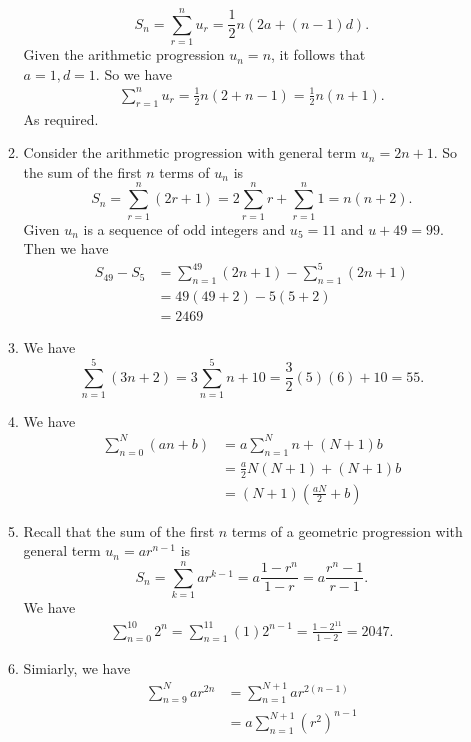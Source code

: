 \documentclass[12pt,oneside]{book}
\begin{document}
\begin{enumerate}
\begin{enumerate}
\[                S_n = \sum_{r=1}^{n} u_r = \frac{1}{2} n (2a + (n-1) d)
            .\] 
            Given the arithmetic progression $u_n = n$, it follows that \\ $a = 1, d = 1$. So we have \begin{align*}
                \sum_{r=1}^{n} u_r = \frac{1}{2} n (2 + n - 1) = \frac{1}{2} n (n + 1). 
            \end{align*}
            As required.
            \item Consider the arithmetic progression with general term $u_n = 2n + 1$. So the sum of the first $n$ terms of $u_n$ is \[
                S_n = \sum_{r=1}^{n} (2r + 1) = 2 \sum_{r=1}^{n} r + \sum_{r=1}^{n} 1 = n(n + 2)  
            .\]  Given $u_n$ is a sequence of odd integers and $u_5 = 11$ and $u+49 = 99$. Then we have \begin{align*}
                S_{49} - S_{5} &= \sum_{n=1}^{49} (2n + 1) - \sum_{n=1}^{5} (2n+1) \\ 
                &= 49(49 + 2) - 5(5 + 2) \\
                &= 2469
            \end{align*}
            \item We have \[
                \sum_{n=1}^{5} (3n + 2) = 3 \sum_{n=1}^{5} n + 10 = \frac{3}{2} (5)(6) + 10 = 55
            .\] 
            \item We have \begin{align*}
                \sum_{n=0}^{N} (an+b) &= a \sum_{n=1}^{N} n + (N+1)b \\
                &= \frac{a}{2} N (N + 1) + (N+1)b \\
                &= (N+1) \left( \frac{aN}{2} + b \right) 
            \end{align*}
            \item  Recall that the sum of the first $n$ terms of a geometric progression with general term $u_n = ar^{n -1}$ is \[
                S_n = \sum_{k=1}^{n} ar^{k-1} = a\frac{1-r^{n}}{1-r} = a \frac{r^{n} - 1}{r - 1}
            .\] We have \begin{align*}
                \sum_{n=0}^{10} 2^n = \sum_{n=1}^{11} (1) 2^{n - 1} = \frac{1-2^{11}}{1-2} = 2047.
            \end{align*}
            \item Simiarly, we have \begin{align*}
                \sum_{n=9}^{N} ar^{2n} &=  \sum_{n=1}^{N+1} ar^{2(n-1)} \\
                &= a \sum_{n=1}^{N+1} (r^2)^{n-1} \\

\end{align*}
\end{enumerate}
\end{enumerate}
\end{document}
